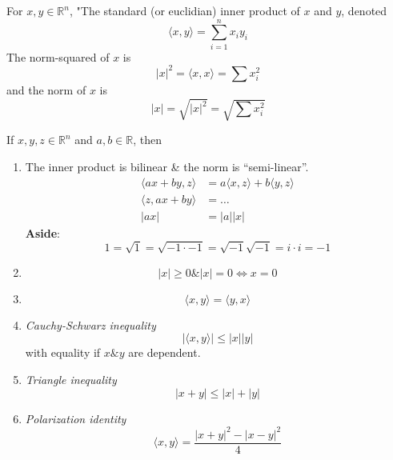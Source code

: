 \documentclass[a4paper]{article}
\numberwithin{equation}{section}
\begin{document}
\begin{definition}
    For $x, y\in\mathbb R^n$, "The standard (or euclidian) inner product of $x$ and $y$, denoted 
    \begin{equation}
        \langle x, y\rangle = \sum_{i=1}^n x_iy_i
    \end{equation}
    The norm-squared of $x$ is 
    \begin{equation}
        |x|^2=\langle x, x\rangle = \sum x_i^2
    \end{equation}
    and the norm of $x$ is
    \begin{equation}
        |x|=\sqrt{|x|^2} = \sqrt{\sum x_i^2}
    \end{equation}
\end{definition}

\begin{proposition}
    If $x, y, z\in\mathbb R^n$ and $a, b\in\mathbb R$, then
    \begin{enumerate}
        \item The inner product is bilinear \& the norm is ``semi-linear''.
        \begin{align}
                \langle ax+by,z \rangle &= a\langle x, z\rangle + b\langle y, z\rangle\\
            \langle z, ax+by \rangle &= \dots\\
            |ax|&=|a||x|
        \end{align}
        \textbf{Aside}: 
        \begin{equation}
            1=\sqrt 1=\sqrt{-1\cdot-1}=\sqrt{-1}\sqrt{-1}=i\cdot i=-1
        \end{equation}
        \item \begin{equation}
            |x|\geq 0 \& |x|=0\iff x=0
        \end{equation}
        \item \begin{equation}
            \langle x,y\rangle = \langle y,x \rangle
        \end{equation}
        \item \textit{Cauchy-Schwarz inequality}
        \begin{equation}
            |\langle x,y\rangle|\leq|x||y|
        \end{equation}
        with equality if $x\&y$ are dependent. 
        \item \textit{Triangle inequality}
        \begin{equation}
            |x+y|\leq |x|+|y|
        \end{equation}
        \item \textit{Polarization identity}
        \begin{equation}
            \langle x,y\rangle = \frac{|x+y|^2-|x-y|^2}{4}
        \end{equation}
    \end{enumerate}
\end{proposition}
\end{document}
